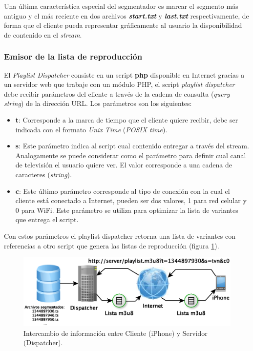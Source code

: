 Una última característica especial del segmentador es marcar el segmento más antiguo y el más reciente en dos archivos \textbf{\textit{start.txt}} y \textbf{\textit{last.txt}} respectivamente, de forma que el cliente pueda representar gráficamente al usuario la disponibilidad de contenido en el \textit{stream}.
		
		\subsubsection{Emisor de la lista de reproducción}
El \textit{Playlist Dispatcher} consiste en un script \textbf{php} disponible en Internet gracias a un servidor web que trabaje con un módulo PHP, el script \textit{playlist dispatcher} debe recibir parámetros del cliente a través de la cadena de consulta (\textit{query string}) de la dirección URL. Los parámetros son los siguientes:

\begin{itemize}
	\item \textbf{t}: Corresponde a la marca de tiempo que el cliente quiere recibir, debe ser indicada con el formato \textit{Unix Time} (\textit{POSIX time}).
	\item \textbf{s}: Este parámetro indica al script cual contenido entregar a través del stream. Analogamente se puede considerar como el parámetro para definir cual canal de televisión el usuario quiere ver. El valor corresponde a una cadena de caracteres (\textit{string}).
	\item \textbf{c}: Este último parámetro corresponde al tipo de conexión con la cual el cliente está conectado a Internet, pueden ser dos valores, 1 para red celular y 0 para WiFi. Este parámetro se utiliza para optimizar la lista de variantes que entrega el script.
\end{itemize}
		
Con estos parámetros el playlist dispatcher retorna una lista de variantes con referencias a otro script que genera las listas de reproducción (figura \ref{diagramaHLSAltaVoz}).


	\begin{figure}[H]
		\centering
		\includegraphics[scale=0.8]{imgs/diagrama-HLS-AltaVoz.eps}
		\caption{Intercambio de información entre Cliente (iPhone) y Servidor (Dispatcher).}
		\label{diagramaHLSAltaVoz}
	\end{figure}		
		
